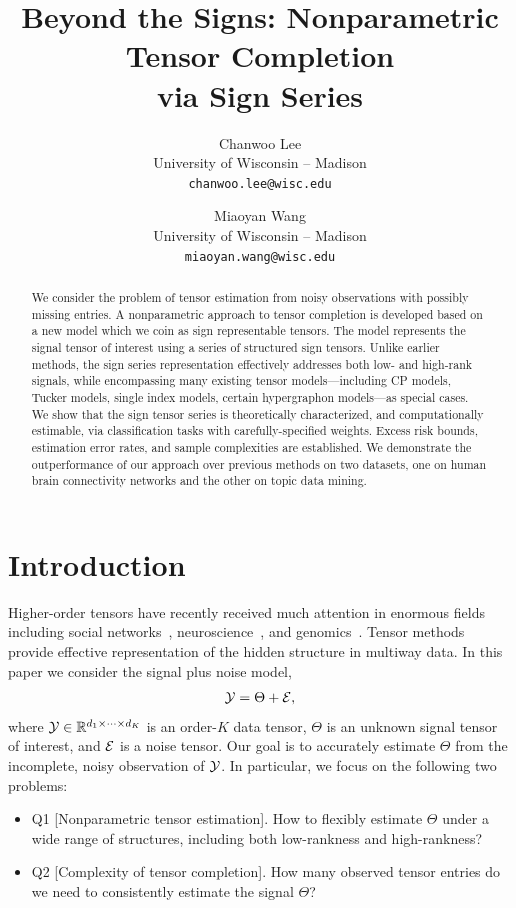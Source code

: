 \documentclass[11pt]{article}
\title{Beyond the Signs: Nonparametric Tensor Completion \\
via Sign Series}
\date{}
\author{%
Chanwoo Lee \\
University of Wisconsin -- Madison\\
\texttt{chanwoo.lee@wisc.edu} \\
\and
Miaoyan Wang \\
University of Wisconsin -- Madison\\
\texttt{miaoyan.wang@wisc.edu} \\
}
\theoremstyle{plain}
\theoremstyle{definition}
\begin{document}
\maketitle

\begin{abstract}
We consider the problem of tensor estimation from noisy observations with possibly missing entries. A nonparametric approach to tensor completion is developed based on a new model which we coin as sign representable tensors. The model represents the signal tensor of interest using a series of structured sign tensors. Unlike earlier methods, the sign series representation effectively addresses both low- and high-rank signals, while encompassing many existing tensor models---including CP models, Tucker models, single index models, certain hypergraphon models---as special cases. We show that the sign tensor series is theoretically characterized, and computationally estimable, via classification tasks with carefully-specified weights. Excess risk bounds, estimation error rates, and sample complexities are established. We demonstrate the outperformance of our approach over previous methods on two datasets, one on human brain connectivity networks and the other on topic data mining. 
\end{abstract}

\section{Introduction}\label{sec:intro}

Higher-order tensors have recently received much attention in enormous fields including social networks~\citep{anandkumar2014tensor}, neuroscience~\citep{wang2017bayesian}, and genomics~\citep{hore2016tensor}. Tensor methods provide effective representation of the hidden structure in multiway data. In this paper we consider the signal plus noise model,
\begin{equation}\label{eq:modelintro}
\mathcal{Y}=\Theta+\mathcal{E},
\end{equation}
where $\mathcal{Y}\in\mathbb{R}^{d_1\times \cdots \times d_K}$ is an order-$K$ data tensor, $\Theta$ is an unknown signal tensor of interest, and $\mathcal{E}$ is a noise tensor. Our goal is to accurately estimate $\Theta$ from the incomplete, noisy observation of $\mathcal{Y}$. In particular, we focus on the following two problems:
\begin{itemize}[leftmargin=*]
\item Q1 [Nonparametric tensor estimation]. How to flexibly estimate $\Theta$ under a wide range of structures, including both low-rankness and high-rankness?
\item Q2 [Complexity of tensor completion]. How many observed tensor entries do we need to consistently estimate the signal $\Theta$?
\end{itemize}
\end{document}
